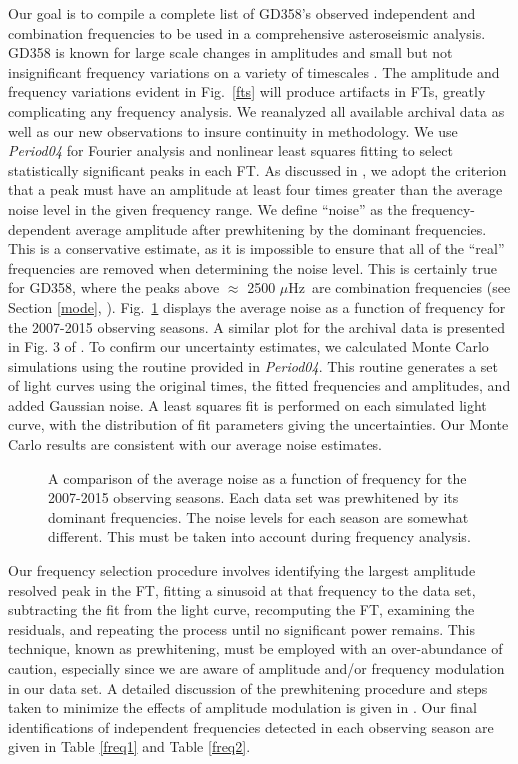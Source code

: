 \documentclass[12pt,preprint]{aastex}
\begin{document}
Our goal is to compile a complete list of GD358's observed independent and combination frequencies 
to be used in a comprehensive asteroseismic analysis. GD358 is known for large scale changes in 
amplitudes and small but not insignificant frequency variations on a variety of timescales 
\citep{Provencal09}.  The amplitude and frequency variations evident in Fig.~\ref{fts} will 
produce artifacts in FTs, greatly complicating any frequency analysis.  
We reanalyzed all available archival data \citep{Provencal09, Kepler03, Winget94, Winget82} 
as well as our new observations to insure continuity in methodology.  We use 
{\sl Period04} \citep{Lenz05} for Fourier analysis and nonlinear least squares fitting to 
select statistically significant peaks in each FT.  As discussed in \citet{Provencal12}, 
we adopt the criterion that a peak must have an amplitude at least four times greater than the 
average noise level in the given frequency range. We define ``noise'' as the frequency-dependent 
average amplitude after prewhitening by the dominant frequencies. This is a conservative estimate, 
as it is impossible to ensure that all of the ``real'' frequencies are removed when determining
the noise level. This is certainly true for GD358, where the peaks above $\approx$ 2500 $\mu$Hz\ 
are combination frequencies (see Section \ref{mode}, \citet{Provencal09}).  Fig.~\ref{noise} displays the average noise 
as a function of frequency for the 2007-2015 observing seasons. A similar plot for the 
archival data is presented in Fig. 3 of \citet{Provencal09}. To confirm our uncertainty 
estimates, we calculated Monte Carlo simulations using the routine provided in {\sl Period04}.  
This routine generates a set of light curves using the original times, the fitted frequencies and 
amplitudes, and added Gaussian noise. A least squares fit is performed on each simulated light 
curve, with the distribution of fit parameters giving the uncertainties. Our Monte Carlo results 
are consistent with our average noise estimates.

\begin{figure}
\caption{A comparison of the average noise as a function of frequency for the 2007-2015 observing 
seasons.  Each data set was prewhitened by its dominant frequencies.  The noise levels for each 
season are somewhat different.  This must be taken into account during frequency analysis.  
\label{noise}
}
\end{figure}

Our frequency selection procedure involves identifying the largest amplitude resolved peak in the FT,
fitting a sinusoid at that frequency to the data set, subtracting the fit from the light curve, 
recomputing the FT, examining the residuals, and repeating the process until no significant power 
remains. This technique, known as prewhitening, must be employed with an over-abundance of caution, 
especially since we are aware of amplitude and/or frequency modulation in our data set. A detailed
discussion of the prewhitening procedure and steps taken to minimize the effects of amplitude 
modulation is given in \citep{Provencal09}. Our final identifications of independent frequencies
detected in each observing season are given in Table \ref{freq1} and Table \ref{freq2}.
\end{document}
